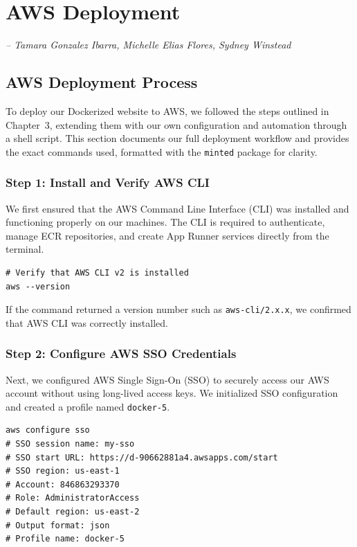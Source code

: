 \chapter{AWS Deployment}
\label{Chapter::itAWSDeployment}

\begin{flushleft}
\small{\textit{-- Tamara Gonzalez Ibarra, Michelle Elias Flores, Sydney Winstead}}
\end{flushleft}

\section{AWS Deployment Process}

To deploy our Dockerized website to AWS, we followed the steps outlined in Chapter~3, extending them with our own configuration and automation through a shell script. This section documents our full deployment workflow and provides the exact commands used, formatted with the \texttt{minted} package for clarity.

\subsection{Step 1: Install and Verify AWS CLI}

We first ensured that the AWS Command Line Interface (CLI) was installed and functioning properly on our machines. The CLI is required to authenticate, manage ECR repositories, and create App Runner services directly from the terminal.

\begin{verbatim}
# Verify that AWS CLI v2 is installed
aws --version
\end{verbatim}

If the command returned a version number such as \texttt{aws-cli/2.x.x}, we confirmed that AWS CLI was correctly installed.

\subsection{Step 2: Configure AWS SSO Credentials}

Next, we configured AWS Single Sign-On (SSO) to securely access our AWS account without using long-lived access keys. We initialized SSO configuration and created a profile named \texttt{docker-5}.

\begin{verbatim}
aws configure sso
# SSO session name: my-sso
# SSO start URL: https://d-90662881a4.awsapps.com/start
# SSO region: us-east-1
# Account: 846863293370
# Role: AdministratorAccess
# Default region: us-east-2
# Output format: json
# Profile name: docker-5
\end{verbatim}

